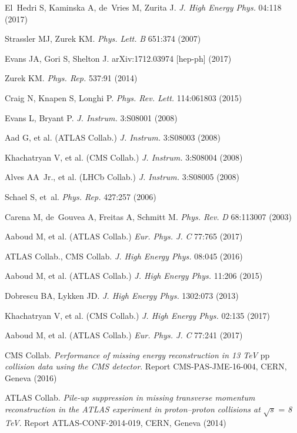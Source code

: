 \documentclass{ar-1col}
\begin{document}
\begin{thebibliography}{175}
El~Hedri S, Kaminska A, de~Vries M, Zurita J. \textit{J. High Energy Phys.} 04:118
(2017)

Strassler MJ, Zurek KM. \textit{Phys. Lett.} \textit{B} 651:374 (2007)

Evans JA, Gori S, Shelton J. arXiv:1712.03974 [hep-ph] (2017)

Zurek KM. \textit{Phys. Rep.} 537:91 (2014)

Craig N, Knapen S, Longhi P. \textit{Phys. Rev. Lett.} 114:061803
(2015)

Evans L, Bryant P. \textit{{J. Instrum.}} 3:{S08001} (2008)

{{Aad G, et al. (ATLAS Collab.)}} \textit{{J. Instrum.}} 3:{S08003} (2008)

{{Khachatryan V, et al. (CMS Collab.)}} \textit{{J. Instrum.}} 3:{S08004} (2008)

{{Alves AA\ Jr., et al. (LHCb Collab.)}} \textit{{J. Instrum.}} 3:{S08005} (2008)

Schael S, et~al. \textit{Phys. Rep.} 427:257 (2006)

Carena M, de~Gouvea A, Freitas A, Schmitt M. \textit{Phys. Rev.}
\textit{D} 68:113007 (2003)

{Aaboud M, et al. (ATLAS Collab}.) \textit{Eur. Phys. J.} \textit{C} 77:765 (2017)

{ATLAS Collab., CMS Collab}. \textit{J. High Energy Phys.} 08:045 (2016)

{Aaboud M, et al. (ATLAS Collab}.) \textit{J. High Energy Phys.} 11:206 (2015)

Dobrescu BA, Lykken JD. \textit{J. High Energy Phys.} 1302:073 (2013)

{Khachatryan V, et al. (CMS Collab}.) \textit{J. High Energy Phys.} 02:135 (2017)

{Aaboud M, et al. (ATLAS Collab}.) \textit{Eur. Phys. J.} \textit{C} 77:241 (2017)

{CMS Collab}. \textit{Performance of missing energy reconstruction in 13 TeV }pp \textit{collision data using the CMS detector}.
Report CMS-PAS-JME-16-004, CERN, Geneva (2016)

ATLAS Collab. \textit{Pile-up suppression in missing transverse momentum reconstruction in the ATLAS experiment in proton--proton collisions at} $\sqrt{s}$ = \textit{8 TeV}. Report ATLAS-CONF-2014-019, CERN, Geneva (2014)


\end{thebibliography}
\end{document}
